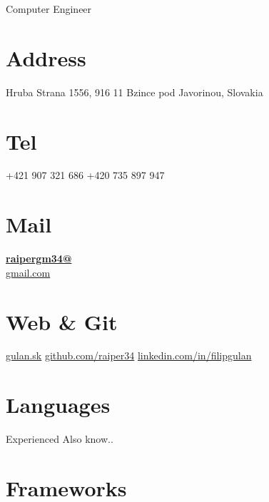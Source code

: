 \documentclass[]{friggeri-cv}
\begin{document}
      {Computer Engineer}
      

\begin{aside}
  \section{Address}
    Hruba Strana 1556,
    916 11 Bzince pod Javorinou, Slovakia
    ~
  \section{Tel}
    +421 907 321 686
    +420 735 897 947
    ~
  \section{Mail}
    \href{mailto:raipergm34@gmail.com}{\textbf{raipergm34@}\\gmail.com}
    ~
  \section{Web \& Git}
    \href{http://www.gulan.sk}{gulan.sk}
    \href{https://github.com/raiper34}{github.com/raiper34}
    \href{https://www.linkedin.com/in/filipgulan}{linkedin.com/in/filipgulan}
    ~
   \section{Languages}
   Experienced
    Also know..
    ~
    \section{Frameworks}
    ~
\end{aside}
~
\end{document}
